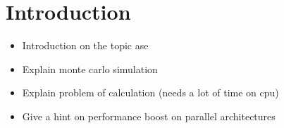 \section{Introduction}
	\begin{itemize}
	\item Introduction on the topic ase
	\item Explain monte carlo simulation
	\item Explain problem of calculation (needs a lot of time on cpu)
	\item Give a hint on performance boost on parallel architectures
	\end{itemize}
